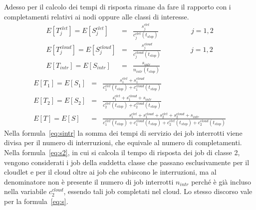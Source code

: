 Adesso per il calcolo dei tempi di risposta rimane da fare il rapporto con i
completamenti relativi ai nodi oppure alle classi di interesse.
%
\setlength\arraycolsep{2pt}
\begin{eqnarray}
\label{eq:sjclet}
E[T_j^{clet}] = E[S_j^{clet}] &=& \frac{s_j^{clet}}{c_j^{clet}(t_{stop})}
\ \qquad \ \qquad \ j = 1, 2 
\\[10pt]
\label{eq:sjcloud}
E[T_j^{cloud}] = E[S_j^{cloud}] &=&
\frac{s_j^{cloud}}{c_j^{cloud}(t_{stop})}
\qquad \ \qquad j = 1, 2 
\\[10pt]
\label{eq:sintr}
E[T_{intr}] = E[S_{intr}] & = &
\frac{s_{intr}}{n_{intr}(t_{stop})}
\end{eqnarray}
\begin{eqnarray}
\label{eq:s1}
E[T_1] = E[S_1] & = &
\frac{s_1^{clet} + s_1^{cloud}}{c_1^{clet}(t_{stop}) + c_1^{cloud}(t_{stop})}
\\[10pt]
\label{eq:s2}
E[T_2] = E[S_2] & = &
\frac{s_1^{clet} + s_1^{cloud} + s_{intr}}{c_2^{clet}(t_{stop}) +
c_2^{cloud}(t_{stop})} \\[10pt]
\label{eq:s}
E[T] = E[S] & = &
\frac{s_1^{clet} + s_1^{cloud} + s_2^{clet} + s_2^{cloud} + s_{intr}}
{c_1^{clet}(t_{stop}) + c_1^{cloud}(t_{stop}) + c_2^{clet}(t_{stop}) +
c_2^{cloud}(t_{stop})} 
\end{eqnarray}
%
Nella formula~\ref{eq:sintr} la somma dei tempi di servizio dei job interrotti
viene divisa per il numero di interruzioni, che equivale al numero di
completamenti.\\
Nella formula~\ref{eq:s2}, in cui si calcola il tempo di risposta dei job di
classe 2, vengono considerati i job della suddetta classe che passano
esclusivamente per il cloudlet e per il cloud oltre ai job che subiscono le
interruzioni, ma al denominatore non è presente il numero di job interrotti
$n_{intr}$ perché è già incluso nella variabile $c_2^{cloud}$, essendo tali job
completati nel cloud. Lo stesso discorso vale per la formula~\ref{eq:s}.
%
